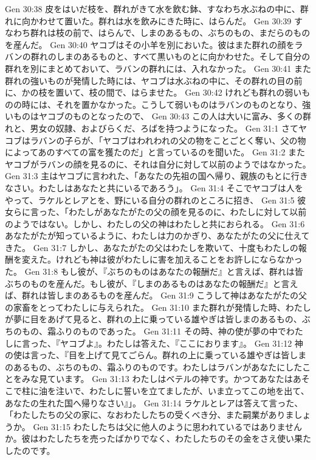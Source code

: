 Gen 30:38  皮をはいだ枝を、群れがきて水を飲む鉢、すなわち水ぶねの中に、群れに向かわせて置いた。群れは水を飲みにきた時に、はらんだ。
Gen 30:39  すなわち群れは枝の前で、はらんで、しまのあるもの、ぶちのもの、まだらのものを産んだ。
Gen 30:40  ヤコブはその小羊を別においた。彼はまた群れの顔をラバンの群れのしまのあるものと、すべて黒いものとに向かわせた。そして自分の群れを別にまとめておいて、ラバンの群れには、入れなかった。
Gen 30:41  また群れの強いものが発情した時には、ヤコブは水ぶねの中に、その群れの目の前に、かの枝を置いて、枝の間で、はらませた。
Gen 30:42  けれども群れの弱いものの時には、それを置かなかった。こうして弱いものはラバンのものとなり、強いものはヤコブのものとなったので、
Gen 30:43  この人は大いに富み、多くの群れと、男女の奴隷、およびらくだ、ろばを持つようになった。
Gen 31:1  さてヤコブはラバンの子らが、「ヤコブはわれわれの父の物をことごとく奪い、父の物によってあのすべての富を獲たのだ」と言っているのを聞いた。
Gen 31:2  またヤコブがラバンの顔を見るのに、それは自分に対して以前のようではなかった。
Gen 31:3  主はヤコブに言われた、「あなたの先祖の国へ帰り、親族のもとに行きなさい。わたしはあなたと共にいるであろう」。
Gen 31:4  そこでヤコブは人をやって、ラケルとレアとを、野にいる自分の群れのところに招き、
Gen 31:5  彼女らに言った、「わたしがあなたがたの父の顔を見るのに、わたしに対して以前のようではない。しかし、わたしの父の神はわたしと共におられる。
Gen 31:6  あなたがたが知っているように、わたしは力のかぎり、あなたがたの父に仕えてきた。
Gen 31:7  しかし、あなたがたの父はわたしを欺いて、十度もわたしの報酬を変えた。けれども神は彼がわたしに害を加えることをお許しにならなかった。
Gen 31:8  もし彼が、『ぶちのものはあなたの報酬だ』と言えば、群れは皆ぶちのものを産んだ。もし彼が、『しまのあるものはあなたの報酬だ』と言えば、群れは皆しまのあるものを産んだ。
Gen 31:9  こうして神はあなたがたの父の家畜をとってわたしに与えられた。
Gen 31:10  また群れが発情した時、わたしが夢に目をあげて見ると、群れの上に乗っている雄やぎは皆しまのあるもの、ぶちのもの、霜ふりのものであった。
Gen 31:11  その時、神の使が夢の中でわたしに言った、『ヤコブよ』。わたしは答えた、『ここにおります』。
Gen 31:12  神の使は言った、『目を上げて見てごらん。群れの上に乗っている雄やぎは皆しまのあるもの、ぶちのもの、霜ふりのものです。わたしはラバンがあなたにしたことをみな見ています。
Gen 31:13  わたしはベテルの神です。かつてあなたはあそこで柱に油を注いで、わたしに誓いを立てましたが、いま立ってこの地を出て、あなたの生れた国へ帰りなさい』」。
Gen 31:14  ラケルとレアは答えて言った、「わたしたちの父の家に、なおわたしたちの受くべき分、また嗣業がありましょうか。
Gen 31:15  わたしたちは父に他人のように思われているではありませんか。彼はわたしたちを売ったばかりでなく、わたしたちのその金をさえ使い果たしたのです。
